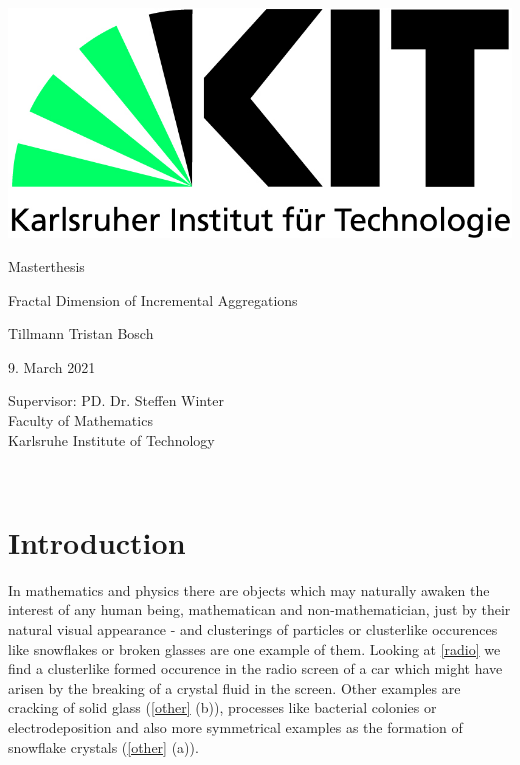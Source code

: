 \documentclass[12pt,a4paper]{scrartcl}
\newcommand{\1}{\mathbbm{1}}
\theoremstyle{definition}
\numberwithin{equation}{section}
\begin{document}
	\pagestyle{empty}

\begin{titlepage}

	\includegraphics[scale=0.45]{images/kit-logo.jpg} 
    \vspace*{2cm} 
\begin{center} \large 
    
   	Masterthesis
    \vspace*{2cm}

    {\huge Fractal Dimension of Incremental Aggregations}\\
    \vspace*{2.5cm}

    Tillmann Tristan Bosch
    \vspace*{1.5cm}

    9. March 2021
    \vspace*{3.5cm}


    Supervisor: PD. Dr. Steffen Winter \\[1cm]
    Faculty of Mathematics\\[1cm]
	Karlsruhe Institute of Technology
\end{center}
\end{titlepage}

\newpage

\newpage
\phantom \\
\newpage

\tableofcontents %

 	\pagestyle{headings}

\setcounter{page}{1}


\newpage

\section{Introduction}
	In mathematics and physics there are objects which may naturally awaken the interest of any human being, mathematican and non-mathematician, just by their natural visual appearance - and clusterings of particles or clusterlike occurences like snowflakes or broken glasses are one example of them. Looking at \autoref{radio} we find a clusterlike formed occurence in the radio screen of a car which might have arisen by the breaking of a crystal fluid in the screen. Other examples are cracking of solid glass (\autoref{other} (b)), processes like bacterial colonies or electrodeposition and also more symmetrical examples as the formation of snowflake crystals (\autoref{other} (a)). \\
	
\end{document}
